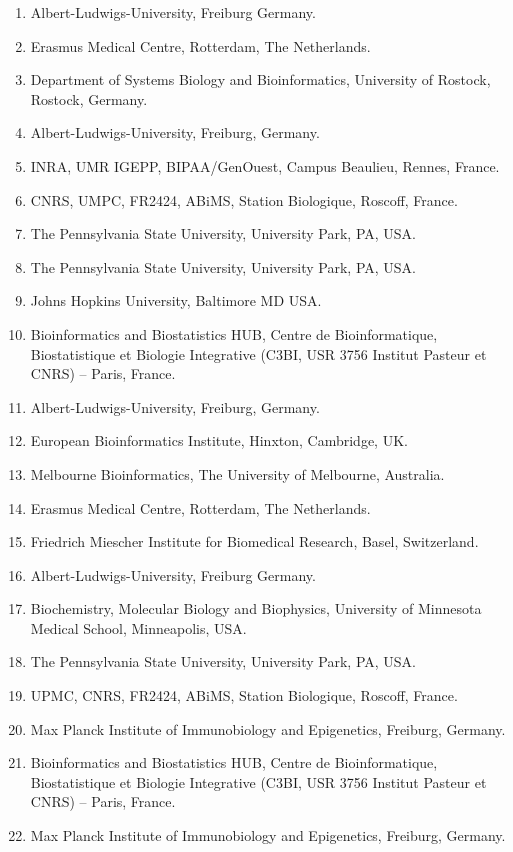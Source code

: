 \small
\begin{enumerate}
\itemsep-0.5em
\item Albert-Ludwigs-University, Freiburg  Germany.
\item Erasmus Medical Centre, Rotterdam, The Netherlands.
\item Department of Systems Biology and Bioinformatics, University of Rostock, Rostock, Germany.
\item Albert-Ludwigs-University, Freiburg, Germany.
\item INRA, UMR IGEPP, BIPAA/GenOuest, Campus Beaulieu, Rennes, France.
\item CNRS, UMPC, FR2424, ABiMS, Station Biologique, Roscoff, France.
\item The Pennsylvania State University, University Park, PA, USA.
\item The Pennsylvania State University, University Park, PA, USA.
\item Johns Hopkins University, Baltimore MD USA.
\item Bioinformatics and Biostatistics HUB, Centre de Bioinformatique, Biostatistique et Biologie Integrative (C3BI, USR 3756 Institut Pasteur et CNRS) – Paris, France.
\item Albert-Ludwigs-University, Freiburg, Germany.
\item European Bioinformatics Institute, Hinxton, Cambridge, UK.
\item Melbourne Bioinformatics, The University of Melbourne, Australia.
\item Erasmus Medical Centre, Rotterdam, The Netherlands.
\item Friedrich Miescher Institute for Biomedical Research, Basel, Switzerland.
\item Albert-Ludwigs-University, Freiburg  Germany.
\item Biochemistry, Molecular Biology and Biophysics, University of Minnesota Medical School, Minneapolis, USA.
\item The Pennsylvania State University, University Park, PA, USA.
\item UPMC, CNRS, FR2424, ABiMS, Station Biologique, Roscoff, France.
\item Max Planck Institute of Immunobiology and Epigenetics, Freiburg, Germany.
\item Bioinformatics and Biostatistics HUB, Centre de Bioinformatique, Biostatistique et Biologie Integrative (C3BI, USR 3756 Institut Pasteur et CNRS) – Paris, France.
\item Max Planck Institute of Immunobiology and Epigenetics, Freiburg, Germany.

\end{enumerate}

